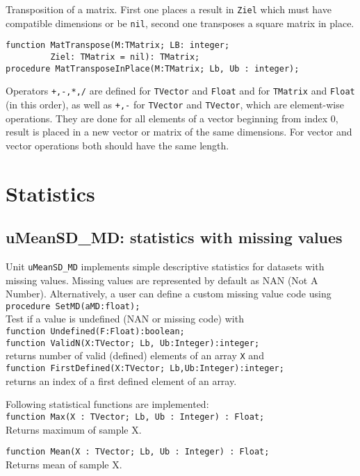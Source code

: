 \documentclass[12pt,a4paper,oneside]{article}
\newcommand{\code}[1]{\texttt{#1}}
\begin{document}
Transposition of a matrix. First one places a result in \code{Ziel} which must have compatible dimensions or be \code{nil}, second one transposes a square matrix in place.\vspace{-6pt}
\begin{verbatim}
function MatTranspose(M:TMatrix; LB: integer; 
         Ziel: TMatrix = nil): TMatrix;
procedure MatTransposeInPlace(M:TMatrix; Lb, Ub : integer);
\end{verbatim}
Operators \code{+,-,*,/} are defined for \code{TVector} and \code{Float} and for \code{TMatrix} and \code{Float} (in this order), as well as \code{+,-} for \code{TVector} and \code{TVector}, which are element-wise operations.	They are done for all elements of a vector beginning from index 0, result is placed in a new vector or matrix of the same dimensions. For vector and vector operations both should have the same length.
\section{Statistics}\label{sec:statistics}
\subsection{uMeanSD\_MD: statistics with missing values}
Unit \code{uMeanSD\_MD} implements simple descriptive statistics for datasets with missing values. Missing values are represented by default as NAN (Not A Number). Alternatively, a user can define a custom missing value code using\\
\code{procedure SetMD(aMD:float);}\\[6pt]
Test if a value is undefined (NAN or missing code) with \\
\code{function Undefined(F:Float):boolean;}\\[6pt]
\code{function ValidN(X:TVector; Lb, Ub:Integer):integer;}\\
returns number of valid (defined) elements of an array \code{X} and\\
\code{function FirstDefined(X:TVector; Lb,Ub:Integer):integer;}\\
returns an index of a first defined element of an array.

Following statistical functions are implemented:\\
\code{function Max(X : TVector; Lb, Ub : Integer) : Float;}\\
Returns maximum of sample X.

\code{function Mean(X : TVector; Lb, Ub : Integer) : Float;}\\
Returns mean of sample X.
\end{document}
